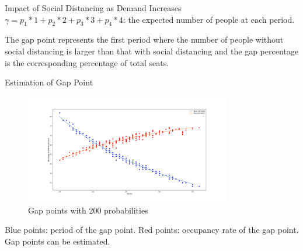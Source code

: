     \begin{frame}{Impact of Social Distancing as Demand Increases}
        \scriptsize
        $\gamma = p_1 * 1 + p_2 * 2 + p_3 * 3 + p_4 * 4$: the expected number of people at each period.
        \begin{figure}[h]
            \centering
          \end{figure}
        \scriptsize
        The gap point represents the first period where the number of people without social distancing is larger than that with social distancing and the gap percentage is the corresponding percentage of total seats.
    \end{frame}
      
    \begin{frame}{Estimation of Gap Point}
      \begin{figure}[ht]
        \centering
        \includegraphics[width = 0.8\textwidth]{./images/gamma_estimation.pdf}
        \caption{Gap points with 200 probabilities}
    \end{figure}
    \scriptsize
    {\color{blue} Blue points}: period of the gap point.
    {\color{red} Red points}: occupancy rate of the gap point. 
    Gap points can be estimated.
    \end{frame}

